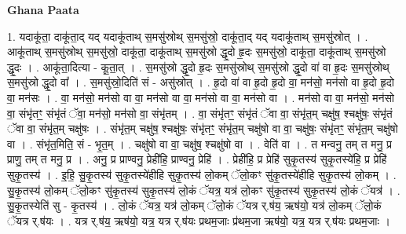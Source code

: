 \documentclass[17pt]{extarticle}
\begin{document}
\textbf{Ghana Paata } \newline

1. यदाकू॑ता॒ दाकू॑ता॒द् यद् यदाकू॑ताथ् स॒मसु॑स्रोथ् स॒मसु॑स्रो॒ दाकू॑ता॒द् यद् यदाकू॑ताथ् स॒मसु॑स्रोत् । . आकू॑ताथ् स॒मसु॑स्रोथ् स॒मसु॑स्रो॒ दाकू॑ता॒ दाकू॑ताथ् स॒मसु॑स्रो द्धृ॒दो हृ॒दः स॒मसु॑स्रो॒ दाकू॑ता॒ दाकू॑ताथ् स॒मसु॑स्रो द्धृ॒दः । . आकू॑ता॒दित्या - कू॒ता॒त् । . स॒मसु॑स्रो द्धृ॒दो हृ॒दः स॒मसु॑स्रोथ् स॒मसु॑स्रो द्धृ॒दो वा॑ वा हृ॒दः स॒मसु॑स्रोथ् स॒मसु॑स्रो
द्धृ॒दो वा᳚ । . स॒मसु॑स्रो॒दिति॑ सं - असु॑स्रोत् । . हृ॒दो वा॑ वा हृ॒दो हृ॒दो वा॒ मन॑सो॒ मन॑सो वा हृ॒दो हृ॒दो वा॒ मन॑सः । . वा॒ मन॑सो॒ मन॑सो वा वा॒ मन॑सो वा वा॒ मन॑सो वा वा॒ मन॑सो वा । . मन॑सो वा वा॒ मन॑सो॒ मन॑सो वा॒ संभृ॑तꣳ॒॒ संभृ॑तं ॅवा॒ मन॑सो॒ मन॑सो वा॒ संभृ॑तम् । . वा॒ संभृ॑तꣳ॒॒ संभृ॑तं ॅवा वा॒ संभृ॑त॒म् चक्षु॑ष॒ श्चक्षु॑षः॒ संभृ॑तं ॅवा वा॒ संभृ॑त॒म् चक्षु॑षः । . संभृ॑त॒म् चक्षु॑ष॒ श्चक्षु॑षः॒ संभृ॑तꣳ॒॒ संभृ॑त॒म् चक्षु॑षो वा वा॒ चक्षु॑षः॒ संभृ॑तꣳ॒॒ संभृ॑त॒म् चक्षु॑षो वा । . संभृ॑त॒मिति॒ सं - भृ॒त॒म् । . चक्षु॑षो वा वा॒ चक्षु॑ष॒ श्चक्षु॑षो वा । . वेति॑ वा । . त मन्वनु॒ तम् त मनु॒ प्र प्राणु॒ तम् त मनु॒ प्र । . अनु॒ प्र प्राण्वनु॒ प्रेही॑हि॒ प्राण्वनु॒ प्रेहि॑ । . प्रेही॑हि॒ प्र प्रेहि॑ सुकृ॒तस्य॑ सुकृ॒तस्ये॑हि॒ प्र प्रेहि॑ सुकृ॒तस्य॑ । . इ॒हि॒ सु॒कृ॒तस्य॑ सुकृ॒तस्ये॑हीहि सुकृ॒तस्य॑ लो॒कम् ॅलो॒कꣳ सु॑कृ॒तस्ये॑हीहि सुकृ॒तस्य॑ लो॒कम् । . सु॒कृ॒तस्य॑ लो॒कम् ॅलो॒कꣳ सु॑कृ॒तस्य॑ सुकृ॒तस्य॑ लो॒कं ॅयत्र॒ यत्र॑ लो॒कꣳ सु॑कृ॒तस्य॑ सुकृ॒तस्य॑ लो॒कं ॅयत्र॑ । . सु॒कृ॒तस्येति॑ सु - कृ॒तस्य॑ । . लो॒कं ॅयत्र॒ यत्र॑ लो॒कम् ॅलो॒कं ॅयत्र र्.ष॑य॒ ऋष॑यो॒ यत्र॑ लो॒कम् ॅलो॒कं ॅयत्र र्.ष॑यः । . यत्र र्.ष॑य॒ ऋष॑यो॒ यत्र॒ यत्र र्.ष॑यः प्रथम॒जाः प्र॑थम॒जा ऋष॑यो॒ यत्र॒ यत्र र्.ष॑यः प्रथम॒जाः । \newline
\end{document}
